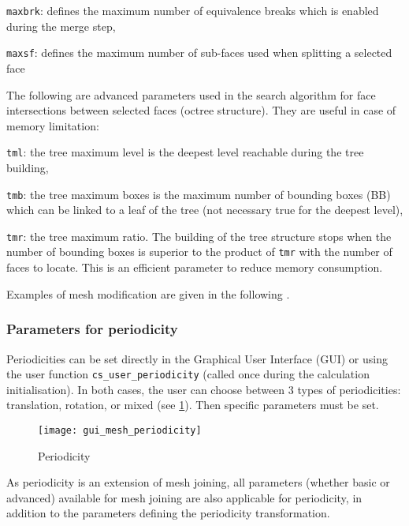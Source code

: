 {{{{\begin{list}{-}{}
\item \texttt{maxbrk}: defines the maximum number of equivalence breaks which is enabled during the merge step,
\item \texttt{maxsf}: defines the maximum number of sub-faces used when splitting a selected face
\end{list}
%
The following are advanced parameters used in the search algorithm for face intersections between selected faces (octree structure). They are useful in case of memory limitation:
\begin{list}{-}{}
\item \texttt{tml}: the tree maximum level is the deepest level reachable during the tree building,
\item \texttt{tmb}: the tree maximum boxes is the maximum number of bounding boxes (BB) which can be linked to a leaf of the tree (not necessary true for the deepest level),
\item \texttt{tmr}: the tree maximum ratio. The building of the tree structure stops when the number of bounding boxes is superior to the product of \texttt{tmr} with the number of faces to locate. This is an efficient parameter to reduce memory consumption.
\end{list}

Examples of mesh modification are given in the following .

\subsubsection{Parameters for periodicity}

Periodicities can be set directly in the Graphical User Interface (GUI) or using the user function \texttt{cs\_user\_periodicity} (called once during the calculation initialisation). In both cases, the user can choose between 3 types of periodicities: translation, rotation, or mixed
(see \figurename\ref{fig:periodicities}).
Then specific parameters must be set.

\begin{figure}[!h]
\begin{center}
\texttt{[image: gui\_mesh\_periodicity]}
\caption{Periodicity}
\label{fig:periodicities}
\end{center}
\end{figure}

As periodicity is an extension of mesh joining, all parameters (whether basic or advanced) available for mesh joining are also applicable for periodicity, in addition to the parameters defining the periodicity transformation.

}}}}

